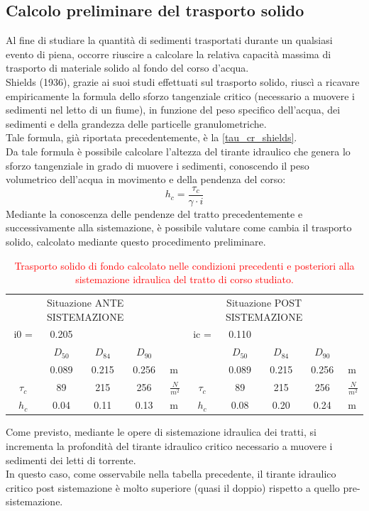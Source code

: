 \subsection{Calcolo preliminare del trasporto solido}
Al fine di studiare la quantità di sedimenti trasportati durante un qualsiasi evento di piena, occorre riuscire a calcolare la relativa capacità massima di trasporto di materiale solido al fondo del corso d'acqua.\\
Shields (1936), grazie ai suoi studi effettuati sul trasporto solido, riuscì a ricavare empiricamente la formula dello sforzo tangenziale critico (necessario a muovere i sedimenti nel letto di un fiume), in funzione del peso specifico dell'acqua, dei sedimenti e della grandezza delle particelle granulometriche.\\
Tale formula, già riportata precedentemente, è la \ref{tau_cr_shields}.\\
Da tale formula è possibile calcolare l'altezza del tirante idraulico che genera lo sforzo tangenziale in grado di muovere i sedimenti, conoscendo il peso volumetrico dell'acqua in movimento e della pendenza del corso:
\begin{equation}
    h_c = \frac{\tau_c}{\gamma \cdot i} 
\end{equation}
Mediante la conoscenza delle pendenze del tratto precedentemente e successivamente alla sistemazione, è possibile valutare come cambia il trasporto solido, calcolato mediante questo procedimento preliminare.\\

\begin{table}[H] \centering
    \caption{\textcolor{red}{Trasporto solido di fondo calcolato nelle condizioni precedenti e posteriori alla sistemazione idraulica del tratto di corso studiato.}}
    \begin{tabular}{cccclccccl}
    \toprule
    \multicolumn{4}{c}{Situazione ANTE SISTEMAZIONE} & & \multicolumn{4}{c}{Situazione POST SISTEMAZIONE} &      \\
    i0 = & 0.205 & & & &ic = & 0.110 & & &      \\
    \midrule
    & $D_{50}$ & $D_{84}$ & $D_{90}$ & & & $D_{50}$ & $D_{84}$ & $D_{90}$ & \\
    \midrule
    & 0.089 & 0.215 & 0.256 & m & & 0.089 & 0.215 & 0.256  & m  \\
    $\tau_c$ & 89 & 215 & 256 & $\frac{N}{m^2}$ & $\tau_c$ & 89 & 215 & 256 & $\frac{N}{m^2}$\\
    $h_c$ & 0.04 & 0.11 & 0.13 & m & $h_c$ & 0.08 & 0.20 & 0.24 & m  \\
    \bottomrule
    \end{tabular}
    \end{table}
Come previsto, mediante le opere di sistemazione idraulica dei tratti, si incrementa la profondità del tirante idraulico critico necessario a muovere i sedimenti dei letti di torrente.\\
In questo caso, come osservabile nella tabella precedente, il tirante idraulico critico post sistemazione è molto superiore (quasi il doppio) rispetto a quello pre-sistemazione.

